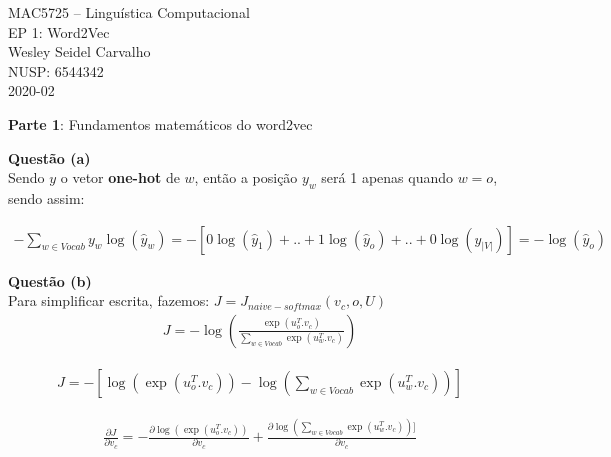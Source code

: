 \documentclass[a4paper,12pt]{article}
\begin{document}
\begin{center}
MAC5725 – Linguística Computacional\\
EP 1: Word2Vec\\
Wesley Seidel Carvalho\\
NUSP: 6544342\\
2020-02\\ %
\end{center}

\begin{comment}
Este é um comentário de múltiplas linhas.
Com certeza útil para esconder partes grandes de texto ainda não revisadas.
Ou para encontrar um problema do seu código LaTeX que não compila.
\end{comment}

{\Large \textbf{Parte 1}: Fundamentos matemáticos do word2vec}\\


\noindent 

{\Large \textbf{Questão (a)}}\\

Sendo $y$ o vetor \textbf{one-hot} de $w$, então a posição $y_w$ será 1 apenas quando  $w = o$, sendo assim:



\begin{align}
- \sum_{w \in Vocab} y_w \log( \hat{y}_w ) = -[0 \log( \hat{y}_1 ) + .. + 1 \log( \hat{y}_o ) + .. +0 \log( \hat{y}_{|V|} )] = - \log( \hat{y}_o )
\end{align}


{\Large \textbf{Questão (b)}}\\

Para simplificar escrita, fazemos: $J = J_{naive-softmax}(v_c, o, U)$
\begin{align}
J = - \log( \frac{ \exp( u_o^T . v_c ) }{ \sum_{w \in Vocab} \exp(  u_w^T . v_c ) } )
\end{align}

\begin{align*}
J = - [\log( \exp( u_o^T . v_c )) - \log( \sum_{w \in Vocab} \exp(  u_w^T . v_c )  )]
\end{align*}


\begin{align*}
\frac{\partial J}{ \partial v_c} = - \frac{ \partial \log( \exp( u_o^T . v_c ))}{  \partial v_c} + \frac{ \partial \log( \sum_{w \in Vocab} \exp(  u_w^T . v_c )  )]}{  \partial v_c}
\end{align*}
\end{document}
